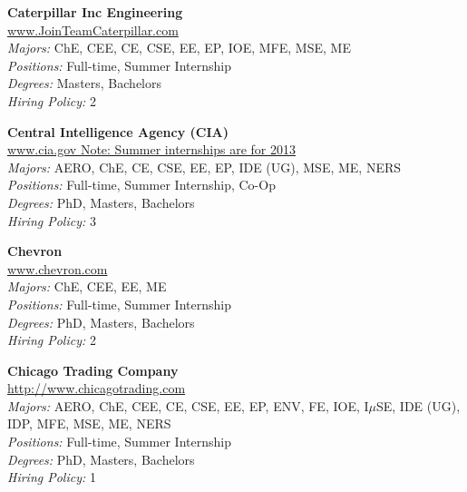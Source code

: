 \documentclass[twoside]{article}
\begin{document}
\begin{center}
\begin{multicols}{3}
\begin{minipage}{.9\columnwidth}{\Large\bf Caterpillar Inc Engineering }\\
	\url{www.JoinTeamCaterpillar.com}\\
	\emph{Majors:} ChE, CEE, CE, CSE, EE, EP, IOE, MFE, MSE, ME\\
	\emph{Positions:} Full-time, Summer Internship\\
	\emph{Degrees:} Masters, Bachelors\\
	\emph{Hiring Policy:} 2\\
\end{minipage}
 
\begin{minipage}{.9\columnwidth}{\Large\bf Central Intelligence Agency (CIA) }\\
	\url{www.cia.gov Note: Summer internships are for 2013}\\
	\emph{Majors:} AERO, ChE, CE, CSE, EE, EP, IDE (UG), MSE, ME, NERS\\
	\emph{Positions:} Full-time, Summer Internship, Co-Op\\
	\emph{Degrees:} PhD, Masters, Bachelors\\
	\emph{Hiring Policy:} 3\\
\end{minipage}
 
\begin{minipage}{.9\columnwidth}{\Large\bf Chevron }\\
	\url{www.chevron.com}\\
	\emph{Majors:} ChE, CEE, EE, ME\\
	\emph{Positions:} Full-time, Summer Internship\\
	\emph{Degrees:} PhD, Masters, Bachelors\\
	\emph{Hiring Policy:} 2\\
\end{minipage}
 
\begin{minipage}{.9\columnwidth}{\Large\bf Chicago Trading Company }\\
	\url{http://www.chicagotrading.com}\\
	\emph{Majors:} AERO, ChE, CEE, CE, CSE, EE, EP, ENV, FE, IOE, I$\mu$SE, IDE (UG), IDP, MFE, MSE, ME, NERS\\
	\emph{Positions:} Full-time, Summer Internship\\
	\emph{Degrees:} PhD, Masters, Bachelors\\
	\emph{Hiring Policy:} 1\\
\end{minipage}
 

\end{multicols}
\end{center}
\end{document}
